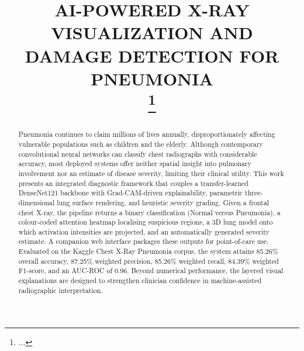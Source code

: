 \documentclass[conference]{IEEEtran}
\begin{document}
\title{AI-POWERED X-RAY VISUALIZATION AND DAMAGE DETECTION FOR PNEUMONIA\\
{\footnotesize \textsuperscript{}}
\thanks{...}
}
\author{
\and
{}
\and
{}
}
\maketitle
\begin{abstract}
Pneumonia continues to claim millions of lives annually, disproportionately affecting vulnerable populations such as children and the elderly. Although contemporary convolutional neural networks can classify chest radiographs with considerable accuracy, most deployed systems offer neither spatial insight into pulmonary involvement nor an estimate of disease severity, limiting their clinical utility. This work presents an integrated diagnostic framework that couples a transfer-learned DenseNet121 backbone with Grad-CAM-driven explainability, parametric three-dimensional lung surface rendering, and heuristic severity grading. Given a frontal chest X-ray, the pipeline returns a binary classification (Normal versus Pneumonia), a colour-coded attention heatmap localising suspicious regions, a 3D lung model onto which activation intensities are projected, and an automatically generated severity estimate. A companion web interface packages these outputs for point-of-care use. Evaluated on the Kaggle Chest X-Ray Pneumonia corpus, the system attains 85.26\% overall accuracy, 87.25\% weighted precision, 85.26\% weighted recall, 84.39\% weighted F1-score, and an AUC-ROC of 0.96. Beyond numerical performance, the layered visual explanations are designed to strengthen clinician confidence in machine-assisted radiographic interpretation.
\end{abstract}
\end{document}
